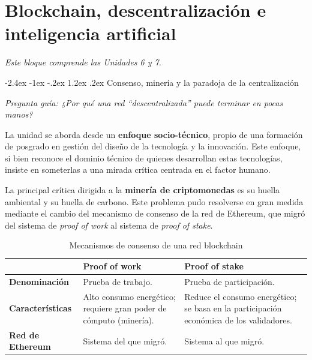 \documentclass[12pt,oneside]{book}
\makeatletter
\renewcommand\section{\@startsection{section}{1}{\z@}%
  {-2.4ex \@plus -1ex \@minus -.2ex}%
  {1.2ex \@plus .2ex}%
  {\normalfont\Large\bfseries\color{blue!50!black}}}
\newcommand{\guia}[1]{\noindent\textit{Pregunta guía: #1}\par\smallskip}
\newcommand{\alcance}[1]{\noindent\textit{#1}\par\smallskip}
\makeatother
\begin{document}
\chapter[Blockchain, descentralización e IA]{Blockchain, descentralización e inteligencia artificial}

\alcance{Este bloque comprende las Unidades 6 y 7.}

\section{Consenso, minería y la paradoja de la centralización}

\guia{¿Por qué una red ``descentralizada'' puede terminar en pocas manos?}

La unidad se aborda desde un \textbf{enfoque socio-técnico}, propio de una formación de posgrado en gestión del diseño de la tecnología y la innovación. Este enfoque, si bien reconoce el dominio técnico de quienes desarrollan estas tecnologías, insiste en someterlas a una mirada crítica centrada en el factor humano.

La principal crítica dirigida a la \textbf{minería de criptomonedas} es su huella ambiental y su huella de carbono. Este problema pudo resolverse en gran medida mediante el cambio del mecanismo de consenso de la red de Ethereum, que migró del sistema de \textit{proof of work} al sistema de \textit{proof of stake}.

\begin{table}[H]
\centering
\caption{Mecanismos de consenso de una red blockchain}
\renewcommand{\arraystretch}{1.25}
\small
\begin{tabularx}{\textwidth}{
    >{\raggedright\arraybackslash}p{}
    >{\raggedright\arraybackslash}X
    >{\raggedright\arraybackslash}X
}
\toprule
& \textbf{Proof of work} & \textbf{Proof of stake} \\
\midrule
\textbf{Denominación} & Prueba de trabajo. & Prueba de participación. \\
\midrule[0.3pt]
\textbf{Características} & Alto consumo energético; requiere gran poder de cómputo (minería). & Reduce el consumo energético; se basa en la participación económica de los validadores. \\
\midrule[0.3pt]
\textbf{Red de Ethereum} & Sistema del que migró. & Sistema al que migró. \\
\bottomrule
\end{tabularx}
\end{table}
\end{document}
